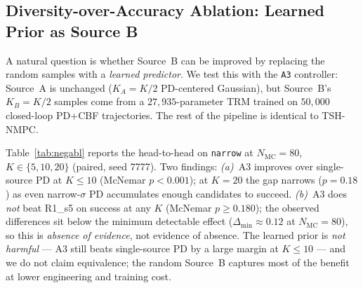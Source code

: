 \documentclass[11pt,onecolumn,a4paper]{article}
\newcommand{\Nm}{N_{\mathrm{MC}}}
\begin{document}
\subsection{Diversity-over-Accuracy Ablation: Learned Prior as Source B}\label{sec:exp-negabl}

A natural question is whether Source~B can be improved by replacing
the random samples with a \emph{learned predictor}. We test this with
the \texttt{A3} controller: Source~A is unchanged ($K_A = K/2$
PD-centered Gaussian), but Source~B's $K_B = K/2$ samples come from a
$27{,}935$-parameter TRM trained on $50{,}000$ closed-loop
PD+CBF trajectories. The rest of the pipeline is identical to TSH-NMPC.

Table~\ref{tab:negabl} reports the head-to-head on \texttt{narrow} at
$\Nm = 80$, $K \in \{5, 10, 20\}$ (paired, seed 7777). Two findings:
\emph{(a)}~A3 improves over single-source PD at $K \le 10$
(McNemar $p < 0.001$); at $K = 20$ the gap narrows ($p = 0.18$) as
even narrow-$\sigma$ PD accumulates enough candidates to succeed.
\emph{(b)}~A3 does \emph{not} beat R1\_s5 on success at any $K$
(McNemar $p \ge 0.180$); the observed differences sit below the
minimum detectable effect ($\Delta_{\min} \approx 0.12$
at $\Nm = 80$), so this is \emph{absence of evidence}, not evidence
of absence. The learned prior is \emph{not harmful} --- A3 still beats
single-source PD by a large margin at $K \le 10$ --- and we do not
claim equivalence;
the random Source~B captures most of the benefit at lower engineering
and training cost.
\end{document}
